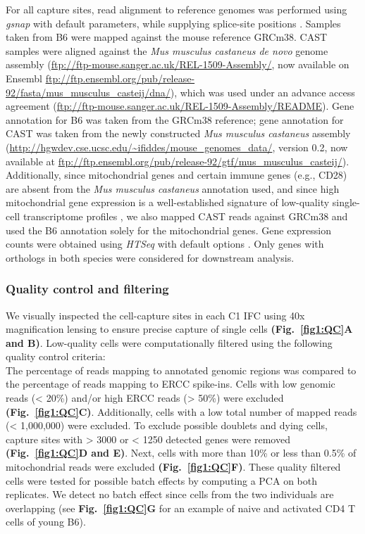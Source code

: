For all capture sites, read alignment to reference genomes was performed using \emph{gsnap} with default parameters, while supplying splice-site positions \citep{Wu2010a}. Samples taken from B6 were mapped against the mouse reference GRCm38. CAST samples were aligned against the \emph{Mus musculus castaneus de novo} genome assembly (\url{ftp://ftp-mouse.sanger.ac.uk/REL-1509-Assembly/}, now available on Ensembl \url{ftp://ftp.ensembl.org/pub/release-92/fasta/mus_musculus_casteij/dna/}), which was used under an advance access agreement (\url{ftp://ftp-mouse.sanger.ac.uk/REL-1509-Assembly/README}). Gene annotation for B6 was taken from the GRCm38 reference; gene annotation for CAST was taken from the newly constructed \emph{Mus musculus castaneus} assembly (\url{http://hgwdev.cse.ucsc.edu/~ifiddes/mouse_genomes_data/}, version 0.2, now available at \url{ftp://ftp.ensembl.org/pub/release-92/gtf/mus_musculus_casteij/}). Additionally, since mitochondrial genes and certain immune genes (e.g., CD28) are absent from the \emph{Mus musculus castaneus} annotation used, and since high mitochondrial gene expression is a well-established signature of low-quality single-cell transcriptome profiles \citep{Ilicic2016}, we also mapped CAST reads against GRCm38 and used the B6 annotation solely for the mitochondrial genes. Gene expression counts were obtained using \emph{HTSeq} with default options \citep{Anders2014}. Only genes with orthologs in both species were considered for downstream analysis. 

\subsubsection{Quality control and filtering}

We visually inspected the cell-capture sites in each C1 IFC using 40x magnification lensing to ensure precise capture of single cells \textbf{(Fig.~\ref{fig1:QC}A and B)}. Low-quality cells were computationally filtered using the following quality control criteria:\\
The percentage of reads mapping to annotated genomic regions was compared to the percentage of reads mapping to ERCC spike-ins. Cells with low genomic reads (< 20\%) and/or high ERCC reads (> 50\%) were excluded \textbf{(Fig.~\ref{fig1:QC}C)}. Additionally, cells with  a low total number of mapped reads (< 1,000,000) were excluded. To exclude possible doublets and dying cells, capture sites with > 3000 or < 1250 detected genes were removed \textbf{(Fig.~\ref{fig1:QC}D and E)}. Next, cells with more than 10\% or less than 0.5\% of mitochondrial reads were excluded \textbf{(Fig.~\ref{fig1:QC}F)}. These quality filtered cells were tested for possible batch effects by computing a PCA on both replicates. We detect no batch effect since cells from the two individuals are overlapping (see \textbf{Fig.~\ref{fig1:QC}G} for an example of naive and activated CD4\plus{} T cells of young B6).\\

